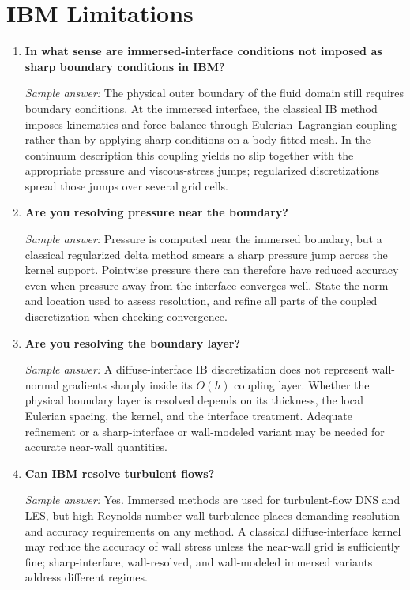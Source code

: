 \documentclass[11pt]{article}
\begin{document}
\section*{IBM Limitations}

\begin{enumerate}[label=\arabic*.]

\item \textbf{In what sense are immersed-interface conditions not imposed as sharp boundary conditions in IBM?}

\textit{Sample answer:}  
The physical outer boundary of the fluid domain still requires boundary conditions. At the immersed interface, the classical IB method imposes kinematics and force balance through Eulerian--Lagrangian coupling rather than by applying sharp conditions on a body-fitted mesh. In the continuum description this coupling yields no slip together with the appropriate pressure and viscous-stress jumps; regularized discretizations spread those jumps over several grid cells.

\item \textbf{Are you resolving pressure near the boundary?}

\textit{Sample answer:}  
Pressure is computed near the immersed boundary, but a classical regularized delta method smears a sharp pressure jump across the kernel support. Pointwise pressure there can therefore have reduced accuracy even when pressure away from the interface converges well. State the norm and location used to assess resolution, and refine all parts of the coupled discretization when checking convergence.

\item \textbf{Are you resolving the boundary layer?}

\textit{Sample answer:}  
A diffuse-interface IB discretization does not represent wall-normal gradients sharply inside its $O(h)$ coupling layer. Whether the physical boundary layer is resolved depends on its thickness, the local Eulerian spacing, the kernel, and the interface treatment. Adequate refinement or a sharp-interface or wall-modeled variant may be needed for accurate near-wall quantities.

\item \textbf{Can IBM resolve turbulent flows?}

\textit{Sample answer:}  
Yes. Immersed methods are used for turbulent-flow DNS and LES, but high-Reynolds-number wall turbulence places demanding resolution and accuracy requirements on any method. A classical diffuse-interface kernel may reduce the accuracy of wall stress unless the near-wall grid is sufficiently fine; sharp-interface, wall-resolved, and wall-modeled immersed variants address different regimes.


\end{enumerate}
\end{document}
